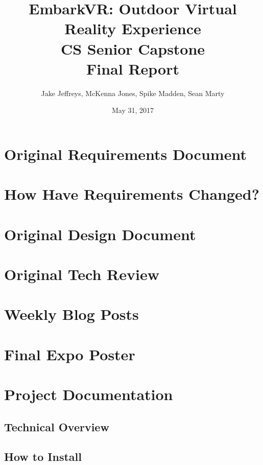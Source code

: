 \documentclass[10pt,journal,compsoc,onecolumn, draftclsnofoot]{IEEEtran}
\title{
EmbarkVR: Outdoor Virtual Reality Experience \\
CS Senior Capstone \\
Final Report\\
\vspace{1mm}
}
\author{Jake Jeffreys, McKenna Jones, Spike Madden, Sean Marty}
\date{May 31, 2017}
\begin{document}
\begin{titlepage}
\maketitle
\vspace{1mm}
\begin{abstract}

\end{abstract}
\vspace{1cm}

\end{titlepage}
\clearpage

\section{Original Requirements Document}


\section{How Have Requirements Changed?}

\section{Original Design Document}


\section{Original Tech Review}


\section{Weekly Blog Posts}

\section{Final Expo Poster}

\section{Project Documentation}
\subsection{Technical Overview}
\subsection{How to Install}
\end{document}
